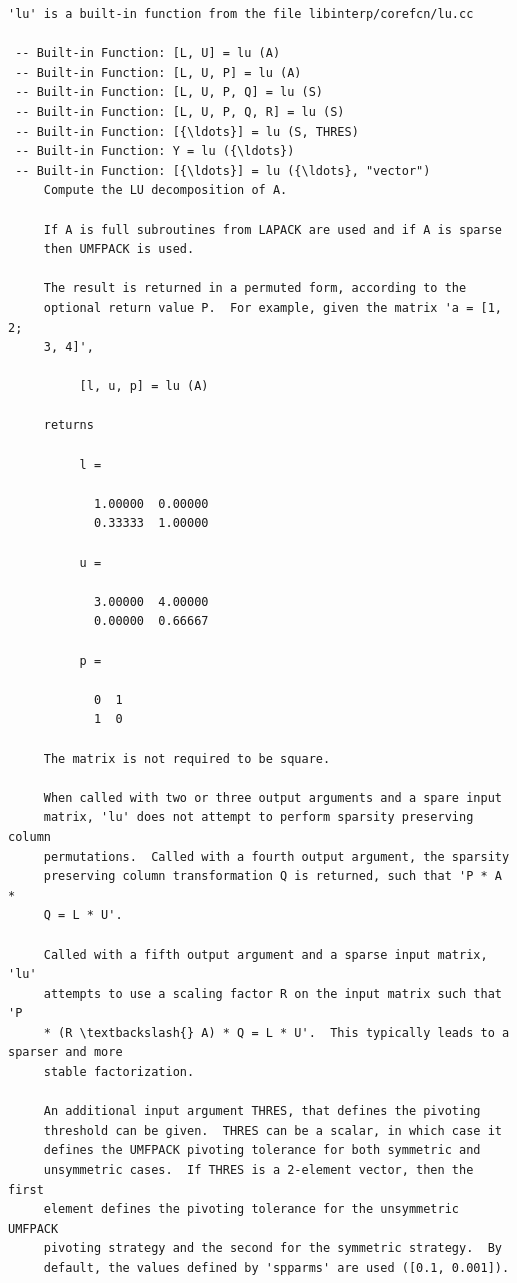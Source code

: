 \documentclass[11pt]{article}
\begin{document}
    \begin{Verbatim}[commandchars=\\\{\}]
'lu' is a built-in function from the file libinterp/corefcn/lu.cc

 -- Built-in Function: [L, U] = lu (A)
 -- Built-in Function: [L, U, P] = lu (A)
 -- Built-in Function: [L, U, P, Q] = lu (S)
 -- Built-in Function: [L, U, P, Q, R] = lu (S)
 -- Built-in Function: [{\ldots}] = lu (S, THRES)
 -- Built-in Function: Y = lu ({\ldots})
 -- Built-in Function: [{\ldots}] = lu ({\ldots}, "vector")
     Compute the LU decomposition of A.

     If A is full subroutines from LAPACK are used and if A is sparse
     then UMFPACK is used.

     The result is returned in a permuted form, according to the
     optional return value P.  For example, given the matrix 'a = [1, 2;
     3, 4]',

          [l, u, p] = lu (A)

     returns

          l =

            1.00000  0.00000
            0.33333  1.00000

          u =

            3.00000  4.00000
            0.00000  0.66667

          p =

            0  1
            1  0

     The matrix is not required to be square.

     When called with two or three output arguments and a spare input
     matrix, 'lu' does not attempt to perform sparsity preserving column
     permutations.  Called with a fourth output argument, the sparsity
     preserving column transformation Q is returned, such that 'P * A *
     Q = L * U'.

     Called with a fifth output argument and a sparse input matrix, 'lu'
     attempts to use a scaling factor R on the input matrix such that 'P
     * (R \textbackslash{} A) * Q = L * U'.  This typically leads to a sparser and more
     stable factorization.

     An additional input argument THRES, that defines the pivoting
     threshold can be given.  THRES can be a scalar, in which case it
     defines the UMFPACK pivoting tolerance for both symmetric and
     unsymmetric cases.  If THRES is a 2-element vector, then the first
     element defines the pivoting tolerance for the unsymmetric UMFPACK
     pivoting strategy and the second for the symmetric strategy.  By
     default, the values defined by 'spparms' are used ([0.1, 0.001]).


\end{Verbatim}
\end{document}
